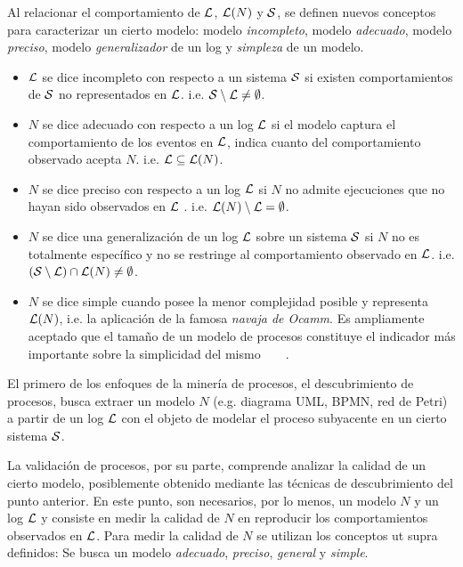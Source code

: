 Al relacionar el comportamiento de ${\mathcal L}$, $\mathcal{L}(N)$ y $\mathcal{S}$, se definen nuevos conceptos~\cite{BuijsDA14}
para caracterizar un cierto modelo: modelo \emph{incompleto},
modelo \emph{adecuado}, modelo \emph{preciso}, modelo \emph{generalizador} de un log y \emph{simpleza} de un modelo.

\begin{itemize}
  \item ${\mathcal L}$ se dice incompleto con respecto a un sistema $\mathcal{S}$ si existen comportamientos
        de $\mathcal{S}$ no representados en ${\mathcal L}$.
        i.e. ${\mathcal{S}} \setminus {\mathcal L} \ne \emptyset$.
  \item $N$ se dice adecuado con respecto a un log ${\mathcal L}$ si el modelo captura el comportamiento 
        de los eventos en ${\mathcal L}$, indica cuanto del comportamiento observado acepta $N$. 
        i.e. ${\mathcal L} \subseteq \mathcal{L}(N)$.
  \item $N$ se dice preciso con respecto a un log ${\mathcal L}$ si $N$ no admite ejecuciones que no hayan
        sido observados en ${\mathcal L}$ .
        i.e. $\mathcal{L}(N) \setminus {\mathcal L} = \emptyset$.
  \item $N$ se dice una generalización de un log ${\mathcal L}$ sobre un sistema $\mathcal{S}$ si $N$
        no es totalmente específico y no se restringe al comportamiento observado en ${\mathcal L}$.
        i.e. $({\mathcal{S}} \setminus {\mathcal L}) \cap \mathcal{L}(N) \neq \emptyset$.
  \item $N$ se dice simple cuando posee la menor complejidad posible y representa $\mathcal{L}(N)$,
        i.e. la aplicación de la famosa \emph{navaja de Ocamm}.
        Es ampliamente aceptado que el tamaño de un modelo de procesos constituye el indicador más importante
        sobre la simplicidad del mismo~\cite{AalstBook}~\cite{Aalst2012}~\cite{LeonRCHH15}~\cite{CarmonaC14}.
\end{itemize}

El primero de los enfoques de la minería de procesos, el descubrimiento de procesos, busca extraer un modelo $N$
(e.g. diagrama UML, BPMN, red de Petri) a partir de un log ${\mathcal L}$ con el objeto de modelar
el proceso subyacente en un cierto sistema $\mathcal{S}$. 

La validación de procesos, por su parte, comprende analizar la calidad de un cierto modelo,
posiblemente obtenido mediante las técnicas de descubrimiento del punto anterior. En este punto, 
son necesarios, por lo menos, un modelo $N$ y un log ${\mathcal L}$ y consiste en medir la calidad 
de $N$ en reproducir los comportamientos observados en ${\mathcal L}$. Para medir la calidad de $N$ se 
utilizan los conceptos ut supra definidos:
Se busca un modelo \emph{adecuado}, \emph{preciso}, \emph{general} y \emph{simple}.

